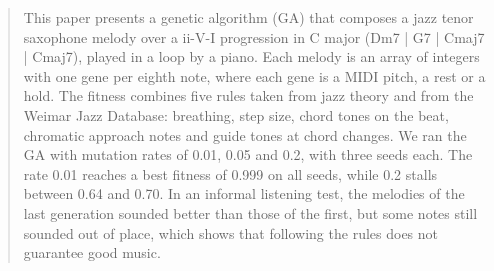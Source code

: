 \begin{abstract}
This paper presents a genetic algorithm (GA) that composes a jazz tenor saxophone melody over a ii-V-I progression in C major (Dm7 | G7 | Cmaj7 | Cmaj7), played in a loop by a piano. Each melody is an array of integers with one gene per eighth note, where each gene is a MIDI pitch, a rest or a hold. The fitness combines five rules taken from jazz theory and from the Weimar Jazz Database: breathing, step size, chord tones on the beat, chromatic approach notes and guide tones at chord changes. We ran the GA with mutation rates of 0.01, 0.05 and 0.2, with three seeds each. The rate 0.01 reaches a best fitness of 0.999 on all seeds, while 0.2 stalls between 0.64 and 0.70. In an informal listening test, the melodies of the last generation sounded better than those of the first, but some notes still sounded out of place, which shows that following the rules does not guarantee good music.
\end{abstract}
